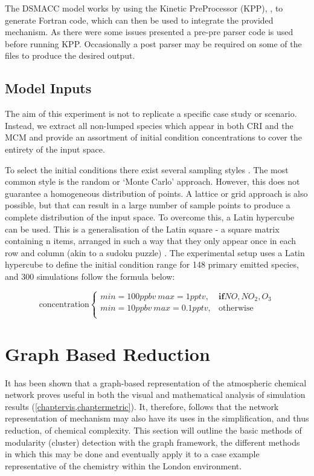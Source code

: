 The DSMACC model works by using the Kinetic PreProcessor (KPP), \citep{kpp}, to generate Fortran code, which can then be used to integrate the provided mechanism. As there were some issues presented a pre-pre parser code is used before running KPP. Occasionally a post parser may be required on some of the files to produce the desired output.

\subsection{Model Inputs}\label{sec:lumpinputs}
The aim of this experiment is not to replicate a specific case study or scenario. Instead, we extract all non-lumped species which appear in both CRI and the MCM and provide an assortment of initial condition concentrations to cover the entirety of the input space.

To select the initial conditions there exist several sampling styles \citep{sampling}. The most common style is the random or `Monte Carlo' approach. However, this does not guarantee a homogeneous distribution of points. A lattice or grid approach is also possible, but that can result in a large number of sample points to produce a complete distribution of the input space. To overcome this, a Latin hypercube can be used. This is a generalisation of the Latin square  -  a square matrix containing n items, arranged in such a way that they only appear once in each row and column (akin to a sudoku puzzle) \citep{lsq}. The experimental setup uses a Latin hypercube to define the initial condition range for 148 primary emitted species, and 300 simulations follow the formula below:

\begin{equation}
\text{concentration}
    \begin{cases}
      min = 100ppbv \ max=1pptv , & \mathbf{if} NO,NO_2,O_3\\
      min = 10ppbv \ max=0.1pptv , & \text{otherwise}\\
    \end{cases}
\label{eqn:icslhs}
  \end{equation}
\section{Graph Based Reduction}\label{sec:graphreduction}
It has been shown that a graph-based representation of the atmospheric chemical network proves useful in both the visual and mathematical analysis of simulation results (\autoref{chaptervis,chaptermetric}). It, therefore, follows that the network representation of mechanism may also have its uses in the simplification, and thus reduction, of chemical complexity.  This section will outline the basic methods of modularity (cluster) detection with the graph framework, the different methods in which this may be done and eventually apply it to a case example representative of the chemistry within the London environment.




